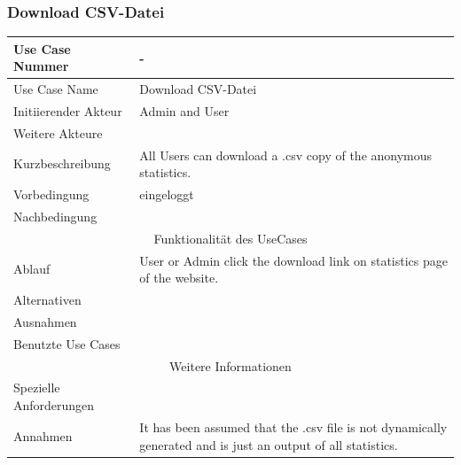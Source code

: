 \documentclass[10pt,a4paper]{article}
\begin{document}
	\subsubsection{Download CSV-Datei}
	\begin{tabular}{|l|p{.5\linewidth}|}
	\hline Use Case Nummer & - \\ 
	\hline Use Case Name & Download CSV-Datei \\ 
	\hline Initiierender Akteur & Admin and User \\
	\hline Weitere Akteure &  \\
	\hline Kurzbeschreibung & All Users can download a .csv copy of the anonymous statistics. \\
	\hline Vorbedingung & eingeloggt \\
	\hline Nachbedingung &   \\
	\hline \multicolumn{2}{|c|}{Funktionalität des UseCases}\\
	\hline Ablauf & User or Admin click the download link on statistics page of the website. \\
	\hline Alternativen &  \\
	\hline Ausnahmen &  \\
	\hline Benutzte Use Cases &  \\
	\hline \multicolumn{2}{|c|}{Weitere Informationen} \\
	\hline Spezielle Anforderungen &  \\
	\hline Annahmen & It has been assumed that the .csv file is not dynamically generated and is just an output of all statistics. \\
	\hline
	\end{tabular}
	
\end{document}
